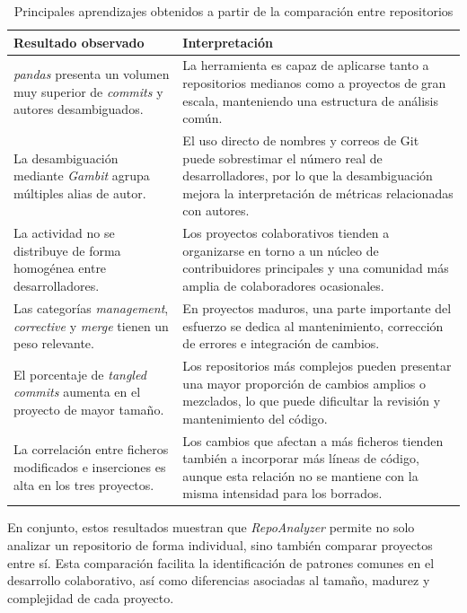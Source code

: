 \documentclass[a4paper, 12pt]{book}
\begin{document}
\begin{table}[H]
\centering
\small
\begin{tabular}{|p{5cm}|p{8cm}|}
\hline
\textbf{Resultado observado} & \textbf{Interpretación} \\
\hline

\emph{pandas} presenta un volumen muy superior de \emph{commits} y autores desambiguados. &
La herramienta es capaz de aplicarse tanto a repositorios medianos como a proyectos de gran escala, manteniendo una estructura de análisis común. \\
\hline

La desambiguación mediante \emph{Gambit} agrupa múltiples alias de autor. &
El uso directo de nombres y correos de Git puede sobrestimar el número real de desarrolladores, por lo que la desambiguación mejora la interpretación de métricas relacionadas con autores. \\
\hline

La actividad no se distribuye de forma homogénea entre desarrolladores. &
Los proyectos colaborativos tienden a organizarse en torno a un núcleo de contribuidores principales y una comunidad más amplia de colaboradores ocasionales. \\
\hline

Las categorías \emph{management}, \emph{corrective} y \emph{merge} tienen un peso relevante. &
En proyectos maduros, una parte importante del esfuerzo se dedica al mantenimiento, corrección de errores e integración de cambios. \\
\hline

El porcentaje de \emph{tangled commits} aumenta en el proyecto de mayor tamaño. &
Los repositorios más complejos pueden presentar una mayor proporción de cambios amplios o mezclados, lo que puede dificultar la revisión y mantenimiento del código. \\
\hline

La correlación entre ficheros modificados e inserciones es alta en los tres proyectos. &
Los cambios que afectan a más ficheros tienden también a incorporar más líneas de código, aunque esta relación no se mantiene con la misma intensidad para los borrados. \\
\hline

\end{tabular}
\caption{Principales aprendizajes obtenidos a partir de la comparación entre repositorios}
\label{tab:aprendizajes_resultados}
\end{table}

En conjunto, estos resultados muestran que \emph{RepoAnalyzer} permite no solo analizar un repositorio de forma individual, sino también comparar proyectos entre sí. Esta comparación facilita la identificación de patrones comunes en el desarrollo colaborativo, así como diferencias asociadas al tamaño, madurez y complejidad de cada proyecto.
\end{document}
